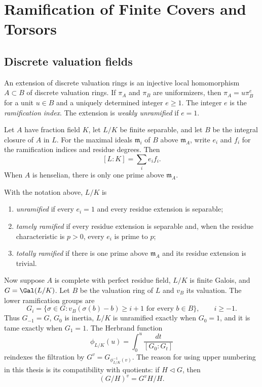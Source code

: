 \section{Ramification of Finite Covers and Torsors}

\subsection{Discrete valuation fields}

\begin{definition}[\stackstag{09E4}]
\label{definition:weakly_unramified_and_tamely_ramified_DVR}
An extension of discrete valuation rings is an injective local homomorphism
$A\subset B$ of discrete valuation rings. If $\pi_A$ and $\pi_B$ are
uniformizers, then $\pi_A=u\pi_B^e$ for a unit $u\in B$ and a uniquely
determined integer $e\geq1$. The integer $e$ is the \emph{ramification index}.
The extension is \emph{weakly unramified} if $e=1$.
\end{definition}

Let $A$ have fraction field $K$, let $L/K$ be finite separable, and let $B$ be
the integral closure of $A$ in $L$. For the maximal ideals $\mathfrak m_i$ of
$B$ above $\mathfrak m_A$, write $e_i$ and $f_i$ for the ramification indices
and residue degrees. Then
\[
    [L:K]=\sum_i e_if_i.
\]
When $A$ is henselian, there is only one prime above $\mathfrak m_A$.

\begin{definition}[\stackstag{09E9}]
\label{definition:tamely_ramified_dvrs}
With the notation above, $L/K$ is
\begin{enumerate}
    \item \emph{unramified} if every $e_i=1$ and every residue extension is
    separable;
    \item \emph{tamely ramified} if every residue extension is separable and,
    when the residue characteristic is $p>0$, every $e_i$ is prime to $p$;
    \item \emph{totally ramified} if there is one prime above
    $\mathfrak m_A$ and its residue extension is trivial.
\end{enumerate}
\end{definition}

Now suppose $A$ is complete with perfect residue field, $L/K$ is finite
Galois, and $G=\Gal(L/K)$. Let $B$ be the valuation ring of $L$ and $v_B$ its
valuation. The lower ramification groups are
\[
    G_i=\{\sigma\in G:v_B(\sigma(b)-b)\geq i+1
       \text{ for every }b\in B\},\qquad i\geq-1.
\]
Thus $G_{-1}=G$, $G_0$ is inertia, $L/K$ is unramified exactly when
$G_0=1$, and it is tame exactly when $G_1=1$. The Herbrand function
\[
    \phi_{L/K}(u)=\int_0^u\frac{dt}{[G_0:G_t]}
\]
reindexes the filtration by $G^v=G_{\phi_{L/K}^{-1}(v)}$. The reason for using
upper numbering in this thesis is its compatibility with quotients: if
$H\triangleleft G$, then
\[
    (G/H)^v=G^vH/H.
\]

